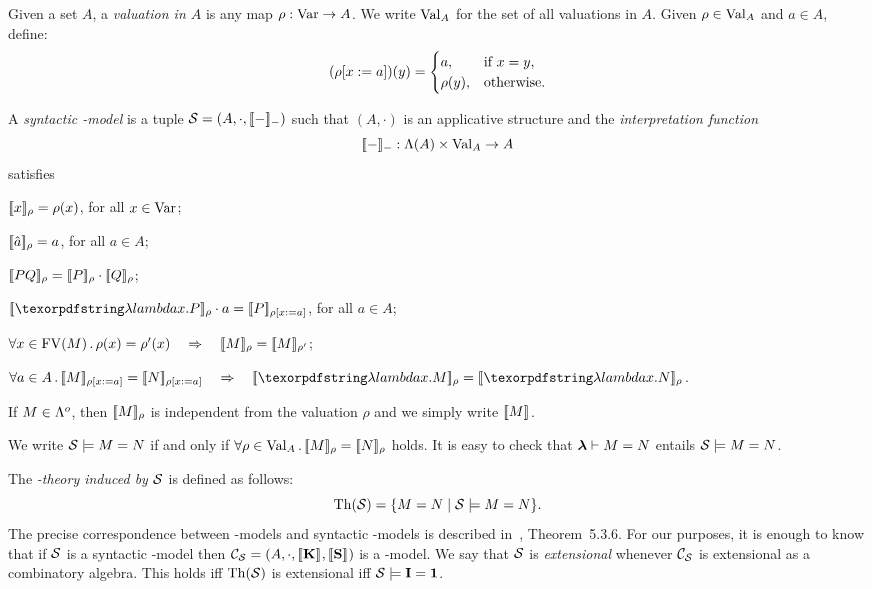 Given a set $A$, a \emph{valuation in $A$} is any map $\rho : \mathrm{Var}\to A$. We write $\mathrm{Val}_{A}$ for the set of all valuations in $A$. Given $\rho\in\mathrm{Val}_{A}$ and $a\in A$, define:
\[
	(\rho[x:=a])(y) = \begin{cases}
	a,&\textrm{if }x=y,\\
	\rho(y),&\textrm{otherwise}.
	\end{cases}
\]

\begin{defi}\label{def:syntmod}
A \emph{syntactic \lam-model} is a tuple $\mathcal{S} = (A,\cdot,[\![ -]\!]_{-})$ such that $(A,\cdot)$ is an applicative structure and the \emph{interpretation function}
\[
	[\![ -]\!]_{-} : \Lambda(A)\times \mathrm{Val}_{A}\to A
\]
satisfies
\bsub
\item\label{def:syntmod1}
	$[\![ x]\!]_{\rho} = \rho(x)$, for all $x\in\mathrm{Var}$;
\item\label{def:syntmod2}
	$[\![ \hat a]\!]_{\rho} = a$, for all $a\in A$;
\item\label{def:syntmod3}
	$[\![ PQ]\!]_{\rho} = [\![ P]\!]_{\rho}\cdot [\![ Q]\!]_{\rho}$;
\item\label{def:syntmod4}
	$\Int{\lam x.P}{\rho}\cdot a = \Int{P}{\rho\repl{x}{a}}$, for all $a\in A$;
\item\label{def:syntmod5}
	$\forall x\in\mathrm{FV}(M)\,.\, \rho(x) = \rho'(x) \quad \Rightarrow \quad [\![ M]\!]_{\rho} = [\![ M]\!]_{\rho'}$;
\item\label{def:syntmod6}
	$\forall a\in A\,.\, \Int{M}{\rho\repl{x}{a}} = \Int{N}{\rho\repl{x}{a}} \imp \Int{\lam x.M}{\rho} = \Int{\lam x.N}{\rho}$.
\esub

\noindent
If $M\in\Lambda^o$, then $[\![ M]\!]_{\rho}$ is independent from the valuation $\rho$ and we simply write $[\![ M]\!]_{}$.

We write $\mathcal{S} \models M = N$ if and only if $\forall \rho\in\mathrm{Val}_{A}\,.\, [\![ M]\!]_{\rho} = [\![ N]\!]_{\rho}$ holds.
It is easy to check that $\boldsymbol{\lambda}\vdash M = N$ entails $\mathcal{S}\models M = N$.
\end{defi}

The \emph{\lam-theory induced by $\mathcal{S}$} is defined as follows:
\[
	\mathrm{Th}(\mathcal{S}) = \{ M = N \mid \mathcal{S}\models M = N\}.
\]
The precise correspondence between \lam-models and syntactic \lam-models is described in~\cite{Bare}, Theorem~5.3.6. For our purposes, it is enough to know that if $\mathcal{S}$ is a syntactic \lam-model then $\mathcal{C}_{\mathcal{S}} = (A,\cdot,[\![ {\mathbf{K}}]\!]_{},[\![ {\mathbf{S}}]\!]_{})$ is a \lam-model. We say that $\mathcal{S}$ is \emph{extensional} whenever $\mathcal{C}_{\mathcal{S}}$ is extensional as a combinatory algebra.
This holds iff $\mathrm{Th}(\mathcal{S})$ is extensional iff $\mathcal{S} \models {\mathbf{I}} = {\mathbf{1}}$.
